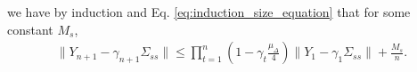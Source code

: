 we have by induction and Eq. \eqref{eq:induction_size_equation} that for some constant $M_s$,
\begin{align*}
    \lVert Y_{n+1} - \gamma_{n+1} \Sigma_{ss} \rVert \leq 
    \prod_{t=1}^n \left(1 - \gamma_t \frac{\mu_\Delta}{4}\right) \lVert Y_1 - \gamma_1 \Sigma_{ss} \rVert 
    + \frac{M_s}{n} .
\end{align*}


